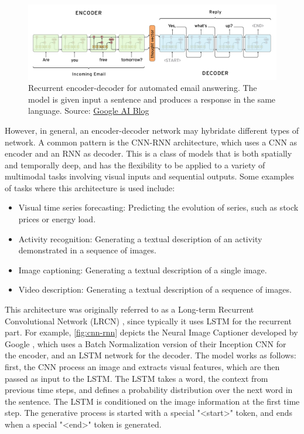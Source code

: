 \begin{figure}[hpt]
	\centering
	\includegraphics[scale=0.3]{images/ch3/rnn-rnn.png}
	\caption{Recurrent encoder-decoder for automated email answering. The model is given input a sentence and produces a response in the same language. Source: \href{https://ai.googleblog.com/2015/11/computer-respond-to-this-email.html}{Google AI Blog}}
	\label{fig:rnn-rnn}
\end{figure}

However, in general, an encoder-decoder network may hybridate different types of network. A common pattern is the CNN-RNN architecture, which uses a CNN as encoder and an RNN as decoder. This is a class of models that is both spatially and temporally deep, and has the flexibility to be applied to a variety of multimodal tasks involving visual inputs and sequential outputs. Some examples of tasks where this architecture is used include:

\begin{itemize}
    \item Visual time series forecasting: Predicting the evolution of series, such as stock prices or energy load.
    \item Activity recognition: Generating a textual description of an activity demonstrated in a sequence of images.
    \item Image captioning: Generating a textual description of a single image.
    \item Video description: Generating a textual description of a sequence of images.
\end{itemize}

This architecture was originally referred to as a Long-term Recurrent Convolutional Network (LRCN) \citep{Donahue2015}, since typically it uses LSTM for the recurrent part. For example, \cref{fig:cnn-rnn} depicts the Neural Image Captioner developed by Google \citep{Vinyals2015}, which uses  a Batch Normalization version of their Inception CNN for the encoder, and an LSTM network for the decoder. The model works as follows: first, the CNN process an image and extracts visual features, which are then passed as input to the LSTM. The LSTM takes a word, the context from previous time steps, and defines a probability distribution over the next word in the sentence. The LSTM is conditioned on the image information at the first time step. The generative process is started with a special "<start>" token, and ends when a special "<end>" token is generated.

